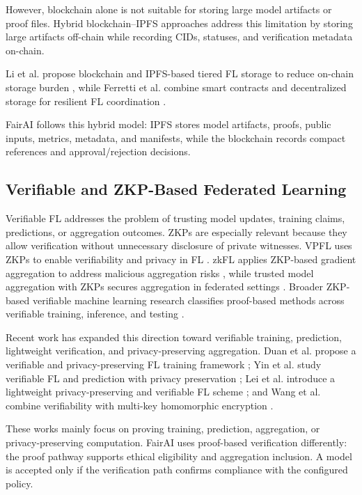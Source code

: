 \documentclass[futureinternet,article,submit,pdftex,moreauthors]{Definitions/mdpi}
\begin{document}
However, blockchain alone is not suitable for storing large model artifacts or proof files. Hybrid blockchain--IPFS approaches address this limitation by storing large artifacts off-chain while recording CIDs, statuses, and verification metadata on-chain. 

Li et al. propose blockchain and IPFS-based tiered FL storage to reduce on-chain storage burden \cite{intro_8}, while Ferretti et al. combine smart contracts and decentralized storage for resilient FL coordination \cite{rw_21}.

FairAI follows this hybrid model: IPFS stores model artifacts, proofs, public inputs, metrics, metadata, and manifests, while the blockchain records compact references and approval/rejection decisions.

\subsection{Verifiable and ZKP-Based Federated Learning}
\label{subsec:rw-zkp-verifiable}

Verifiable FL addresses the problem of trusting model updates, training claims, predictions, or aggregation outcomes. ZKPs are especially relevant because they allow verification without unnecessary disclosure of private witnesses. VPFL uses ZKPs to enable verifiability and privacy in FL \cite{intro_9}. zkFL applies ZKP-based gradient aggregation to address malicious aggregation risks \cite{intro_10}, while trusted model aggregation with ZKPs secures aggregation in federated settings \cite{intro_14}. Broader ZKP-based verifiable machine learning research classifies proof-based methods across verifiable training, inference, and testing \cite{intro_11}.

Recent work has expanded this direction toward verifiable training, prediction, lightweight verification, and privacy-preserving aggregation. Duan et al. propose a verifiable and privacy-preserving FL training framework \cite{rw_22}; Yin et al. study verifiable FL and prediction with privacy preservation \cite{rw_23}; Lei et al. introduce a lightweight privacy-preserving and verifiable FL scheme \cite{rw_24}; and Wang et al. combine verifiability with multi-key homomorphic encryption \cite{rw_25}.

These works mainly focus on proving training, prediction, aggregation, or privacy-preserving computation. FairAI uses proof-based verification differently: the proof pathway supports ethical eligibility and aggregation inclusion. A model is accepted only if the verification path confirms compliance with the configured policy.
\end{document}
